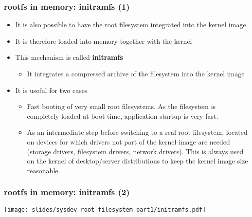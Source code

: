 \begin{frame}
  \frametitle{rootfs in memory: initramfs (1)}
  \begin{itemize}
  \item It is also possible to have the root filesystem integrated
    into the kernel image
  \item It is therefore loaded into memory together with the kernel
  \item This mechanism is called {\bf initramfs}
    \begin{itemize}
    \item It integrates a compressed archive of the filesystem into
      the kernel image
    \end{itemize}
  \item It is useful for two cases
    \begin{itemize}
    \item Fast booting of very small root filesystems. As the
      filesystem is completely loaded at boot time, application
      startup is very fast.
    \item As an intermediate step before switching to a real root
      filesystem, located on devices for which drivers not part of the
      kernel image are needed (storage drivers, filesystem drivers,
      network drivers). This is always used on the kernel of
      desktop/server distributions to keep the kernel image size
      reasonable.
    \end{itemize}
  \end{itemize}
\end{frame}

\begin{frame}
  \frametitle{rootfs in memory: initramfs (2)}
  \begin{center}
    \texttt{[image: slides/sysdev-root-filesystem-part1/initramfs.pdf]}
  \end{center}
\end{frame}

